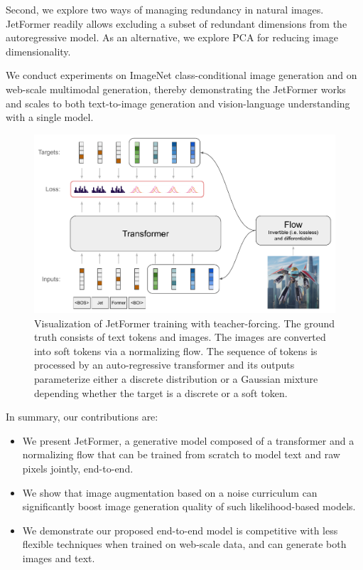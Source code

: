\documentclass{article} %
\newcommand{\name}{JetFormer\xspace}
\begin{document}
Second, we explore two ways of managing redundancy in natural images. \name readily allows excluding a subset of redundant dimensions from the autoregressive model. As an alternative, we explore PCA for reducing image dimensionality. 

We conduct experiments on ImageNet class-conditional image generation and on web-scale multimodal generation, thereby demonstrating the \name works and scales to both text-to-image generation and vision-language understanding with a single model.

\begin{figure}[t]
    \centering
    \includegraphics[width=0.88\columnwidth]{figures/method.pdf}
    \caption{Visualization of JetFormer training with teacher-forcing. The ground truth consists of text tokens and images. The images are converted into soft tokens via a normalizing flow. The sequence of tokens is processed by an auto-regressive transformer and its outputs parameterize either a discrete distribution or a Gaussian mixture depending whether the target is a discrete or a soft token.
\label{fig:overview}}
\vspace{-1.5mm}
\end{figure}

In summary, our contributions are:
\begin{itemize}
    \item We present \name, a generative model composed of a transformer and a normalizing flow that can be trained from scratch to model text and raw pixels jointly, end-to-end.
    \item We show that image augmentation based on a noise curriculum can significantly boost image generation quality of such likelihood-based models.
    \item We demonstrate our proposed end-to-end model is competitive with less flexible techniques when trained on web-scale data, and can generate both images and text.
\end{itemize}
\end{document}
